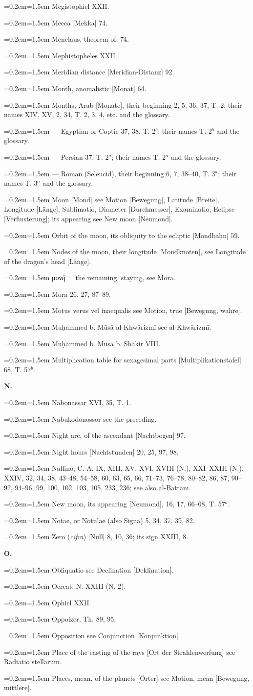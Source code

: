 \documentclass[11pt]{article}
\newcommand{\Pg}[1]{\marginpar{\footnotesize\color{gray}#1}}
\newcommand{\Entry}[1]{\par{\parskip=0.2em\relax\noindent\hangindent=1.5em\hangafter=1 #1\par}}
\begin{document}
\Entry{Megistophiel XXII.}
\Entry{Mecca [Mekka] 74.}
\Entry{Menelaus, theorem of, 74.}
\Entry{Mephistopheles XXII.}
\Entry{Meridian distance [Meridian-Distanz] 92.}
\Entry{\Pg{253}Month, anomalistic [Monat] 64.}
\Entry{Months, Arab [Monate], their beginning 2, 5, 36, 37, T. 2; their names XIV, XV, 2, 34, T. 2, 3, 4, etc. and the glossary.}
\Entry{— Egyptian or Coptic 37, 38, T. 2$^{b}$; their names T. 2$^{b}$ and the glossary.}
\Entry{— Persian 37, T. 2$^{a}$; their names T. 2$^{a}$ and the glossary.}
\Entry{— Roman (Seleucid), their beginning 6, 7, 38–40, T. 3$^{a}$; their names T. 3$^{a}$ and the glossary.}
\Entry{Moon [Mond] see Motion [Bewegung], Latitude [Breite], Longitude [Länge], Sublimatio, Diameter [Durchmesser], Examinatio, Eclipse [Verfinsterung]; its appearing see New moon [Neumond].}
\Entry{Orbit of the moon, its obliquity to the ecliptic [Mondbahn] 59.}
\Entry{Nodes of the moon, their longitude [Mondknoten], see Longitude of the dragon's head [Länge].}
\Entry{{\greekfont μονή} = the remaining, staying, see Mora.}
\Entry{Mora 26, 27, 87–89.}
\Entry{Motus verus vel inaequalis see Motion, true [Bewegung, wahre].}
\Entry{Muḥammed b. Mūsā al-Khwārizmī see al-Khwārizmī.}
\Entry{Muḥammed b. Mūsā b. Shākir VIII.}
\Entry{Multiplication table for sexagesimal parts [Multiplikationstafel] 68, T. 57$^{b}$.}
\par\begin{center}\textbf{N.}\end{center}
\Entry{Nabonassar XVI, 35, T. 1.}
\Entry{Nabukodonossor see the preceding.}
\Entry{Night arc, of the ascendant [Nachtbogen] 97.}
\Entry{Night hours [Nachtstunden] 20, 25, 97, 98.}
\Entry{Nallino, C. A. IX, XIII, XV, XVI, XVIII (N.), XXI–XXIII (N.), XXIV, 32, 34, 38, 43–48, 54–58, 60, 63, 65, 66, 71–73, 76–78, 80–82, 86, 87, 90–92, 94–96, 99, 100, 102, 103, 105, 233, 236; see also al-Battānī.}
\Entry{New moon, its appearing [Neumond], 16, 17, 66–68, T. 57$^{a}$.}
\Entry{Notae, or Notulae (also Signa) 5, 34, 37, 39, 82.}
\Entry{Zero (\emph{cifra}) [Null] 8, 10, 36; its sign XXIII, 8.}
\par\begin{center}\textbf{O.}\end{center}
\Entry{Obliquatio see Declination [Deklination].}
\Entry{Ocreat, N. XXIII (N. 2).}
\Entry{Ophiel XXII.}
\Entry{Oppolzer, Th. 89, 95.}
\Entry{Opposition see Conjunction [Konjunktion].}
\Entry{Place of the casting of the rays [Ort der Strahlenwerfung] see Radiatio stellarum.}
\Entry{Places, mean, of the planets [Örter] see Motion, mean [Bewegung, mittlere].}
\end{document}
